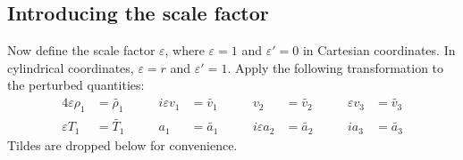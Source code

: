 \documentclass[11pt, fleqn]{article}
\newcommand{\eps}{\varepsilon}
\begin{document}
\subsection{Introducing the scale factor}
Now define the scale factor $\eps$, where $\eps = 1$ and $\eps' = 0$ in Cartesian coordinates. In cylindrical coordinates, $\eps = r$ and $\eps' = 1$. Apply the following transformation to the perturbed quantities:
\begin{alignat*}{4}
	\eps \rho_1 &= \widetilde{\rho_1}		\qquad&		i\eps v_1 &= \widetilde{v_1}		\qquad&		v_2 		  &= \widetilde{v_2}		\qquad&			\eps v_3 &= \widetilde{v_3}			\\
	\eps T_1		&= \widetilde{T_1}						&					a_1 &= \widetilde{a_1}					&		i\eps a_2	&= \widetilde{a_2}					&			ia_3 		 &= \widetilde{a_3}
\end{alignat*}
Tildes are dropped below for convenience.
\end{document}
